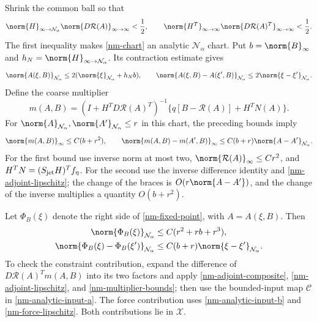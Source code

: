 Shrink the common ball so that
\begin{equation}\label{nm-neumann-smallness}
 \norm{H}_{\infty\to\mathcal N_\alpha}
       \norm{D\mathcal R(A)}_{\infty\to\infty}<\frac12,
 \qquad
 \norm{H^T}_{\infty\to\infty}
       \norm{D\mathcal R(A)^T}_{\infty\to\infty}<\frac12.
\end{equation}
The first inequality makes \eqref{nm-chart} an analytic
$\mathcal N_\alpha$ chart. Put $b=\norm{B}_\infty$ and
$h_N=\norm{H}_{\infty\to\mathcal N_\alpha}$. Its contraction
estimate gives
\begin{equation}\label{nm-chart-estimates}
 \norm{A(\xi,B)}_{\mathcal N_\alpha}
 \le2(\norm{\xi}_{\mathcal N_\alpha}+h_Nb),\qquad
 \norm{A(\xi,B)-A(\xi',B)}_{\mathcal N_\alpha}
 \le2\norm{\xi-\xi'}_{\mathcal N_\alpha}.
\end{equation}
Define the coarse multiplier
\begin{equation}\label{nm-multiplier}
 m(A,B)=(I+H^TD\mathcal R(A)^T)^{-1}
             \{q[B-\mathcal R(A)]+H^TN(A)\}.
\end{equation}
For $\norm{A}_{\mathcal N_\alpha},\norm{A'}_{\mathcal N_\alpha}\le r$
in this chart, the preceding bounds imply
\begin{equation}\label{nm-multiplier-bounds}
 \norm{m(A,B)}_\infty\le C(b+r^2),\qquad
 \norm{m(A,B)-m(A',B)}_\infty
 \le C(b+r)\norm{A-A'}_{\mathcal N_\alpha}.
\end{equation}
For the first bound use inverse norm at most two,
$\norm{\mathcal R(A)}_\infty\le Cr^2$, and
$H^TN=(S_{\rm jet}H)^Tf_\eta$. For the second use the inverse
difference identity and \eqref{nm-adjoint-lipschitz}; the change
of the braces is $O(r\norm{A-A'})$, and the change of the inverse
multiplies a quantity $O(b+r^2)$.

Let $\Phi_B(\xi)$ denote the right side of
\eqref{nm-fixed-point}, with $A=A(\xi,B)$. Then
\begin{align}
 \norm{\Phi_B(\xi)}_{\mathcal N_\alpha}
 &\le C(r^2+rb+r^3),                                   \label{nm-contraction-size}\\
 \norm{\Phi_B(\xi)-\Phi_B(\xi')}_{\mathcal N_\alpha}
 &\le C(b+r)\norm{\xi-\xi'}_{\mathcal N_\alpha}.          \label{nm-contraction-lipschitz}
\end{align}
To check the constraint contribution, expand the difference of
$D\mathcal R(A)^Tm(A,B)$ into its two factors and apply
\eqref{nm-adjoint-composite}, \eqref{nm-adjoint-lipschitz}, and
\eqref{nm-multiplier-bounds}; then use the bounded-input map
$\mathcal C$ in \eqref{nm-analytic-input-a}. The force contribution
uses \eqref{nm-analytic-input-b} and
\eqref{nm-force-lipschitz}. Both contributions lie in $\mathcal X$.

